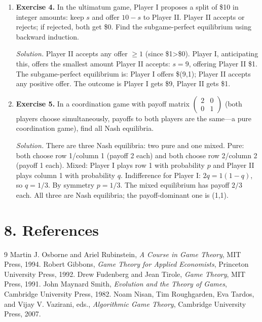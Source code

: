 \begin{enumerate}[leftmargin=*,itemsep=0.9em]
\item \textbf{Exercise 4.} In the ultimatum game, Player I proposes a split of \$10 in integer amounts: keep $s$ and offer $10-s$ to Player II. Player II accepts or rejects; if rejected, both get \$0. Find the subgame-perfect equilibrium using backward induction.

\emph{Solution.} Player II accepts any offer $\geq 1$ (since \$1>\$0). Player I, anticipating this, offers the smallest amount Player II accepts: $s=9$, offering Player II \$1. The subgame-perfect equilibrium is: Player I offers \$(9,1); Player II accepts any positive offer. The outcome is Player I gets \$9, Player II gets \$1.

\item \textbf{Exercise 5.} In a coordination game with payoff matrix $\begin{pmatrix}2&0\\0&1\end{pmatrix}$ (both players choose simultaneously, payoffs to both players are the same---a pure coordination game), find all Nash equilibria.

\emph{Solution.} There are three Nash equilibria: two pure and one mixed. Pure: both choose row 1/column 1 (payoff 2 each) and both choose row 2/column 2 (payoff 1 each). Mixed: Player I plays row 1 with probability $p$ and Player II plays column 1 with probability $q$. Indifference for Player I: $2q=1(1-q)$, so $q=1/3$. By symmetry $p=1/3$. The mixed equilibrium has payoff $2/3$ each. All three are Nash equilibria; the payoff-dominant one is (1,1).

\end{enumerate}
\section*{8. References}

\begin{thebibliography}{9}
 Martin J. Osborne and Ariel Rubinstein, \emph{A Course in Game Theory}, MIT Press, 1994.
 Robert Gibbons, \emph{Game Theory for Applied Economists}, Princeton University Press, 1992.
 Drew Fudenberg and Jean Tirole, \emph{Game Theory}, MIT Press, 1991.
 John Maynard Smith, \emph{Evolution and the Theory of Games}, Cambridge University Press, 1982.
 Noam Nisan, Tim Roughgarden, Eva Tardos, and Vijay V. Vazirani, eds., \emph{Algorithmic Game Theory}, Cambridge University Press, 2007.
\end{thebibliography}
